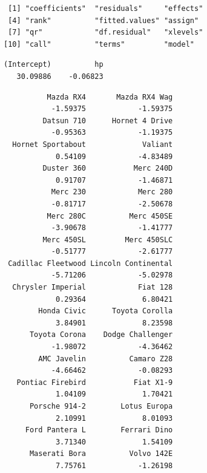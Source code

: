 \documentclass[
]{krantz}
\makeatletter
\newenvironment{Shaded}{\begin{snugshade}}{\end{snugshade}}
\newcommand{\NormalTok}[1]{#1}
\newcommand{\OperatorTok}[1]{\textcolor[rgb]{0.43,0.43,0.43}{\textbf{#1}}}
\newcommand{\StringTok}[1]{\textcolor[rgb]{0.5,0.5,0.5}{#1}}
\newenvironment{kframe}{%
\medskip{}
\setlength{\fboxsep}{.8em}
 \def\at@end@of@kframe{}%
 \ifinner\ifhmode%
  \def\at@end@of@kframe{\end{minipage}}%
  \begin{minipage}{\columnwidth}%
 \fi\fi%
 \def\FrameCommand##1{\hskip\@totalleftmargin \hskip-\fboxsep
 \colorbox{shadecolor}{##1}\hskip-\fboxsep
     \hskip-\linewidth \hskip-\@totalleftmargin \hskip\columnwidth}%
 \MakeFramed {\advance\hsize-\width
   \@totalleftmargin\z@ \linewidth\hsize
   \@setminipage}}%
 {\par\unskip\endMakeFramed%
 \at@end@of@kframe}
\renewenvironment{Shaded}{\begin{kframe}}{\end{kframe}}
\makeatother
\begin{document}
\begin{verbatim}
 [1] "coefficients"  "residuals"     "effects"      
 [4] "rank"          "fitted.values" "assign"       
 [7] "qr"            "df.residual"   "xlevels"      
[10] "call"          "terms"         "model"        
\end{verbatim}

\begin{Shaded}
\end{Shaded}

\begin{verbatim}
(Intercept)          hp 
   30.09886    -0.06823 
\end{verbatim}

\begin{Shaded}
\end{Shaded}

\begin{verbatim}
          Mazda RX4       Mazda RX4 Wag 
           -1.59375            -1.59375 
         Datsun 710      Hornet 4 Drive 
           -0.95363            -1.19375 
  Hornet Sportabout             Valiant 
            0.54109            -4.83489 
         Duster 360           Merc 240D 
            0.91707            -1.46871 
           Merc 230            Merc 280 
           -0.81717            -2.50678 
          Merc 280C          Merc 450SE 
           -3.90678            -1.41777 
         Merc 450SL         Merc 450SLC 
           -0.51777            -2.61777 
 Cadillac Fleetwood Lincoln Continental 
           -5.71206            -5.02978 
  Chrysler Imperial            Fiat 128 
            0.29364             6.80421 
        Honda Civic      Toyota Corolla 
            3.84901             8.23598 
      Toyota Corona    Dodge Challenger 
           -1.98072            -4.36462 
        AMC Javelin          Camaro Z28 
           -4.66462            -0.08293 
   Pontiac Firebird           Fiat X1-9 
            1.04109             1.70421 
      Porsche 914-2        Lotus Europa 
            2.10991             8.01093 
     Ford Pantera L        Ferrari Dino 
            3.71340             1.54109 
      Maserati Bora          Volvo 142E 
            7.75761            -1.26198 
\end{verbatim}
\end{document}
